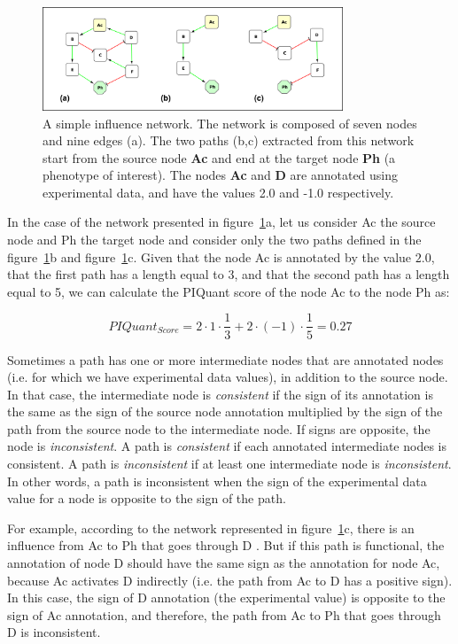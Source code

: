 \begin{figure}
  \centering
  \includegraphics[width=0.8\textwidth]{graphics/piquant_networks}
  \caption{A simple influence network. The network is composed of seven nodes
and nine edges (a). The two paths (b,c) extracted from this network start from
the source node \textbf{Ac} and end at the target node \textbf{Ph} (a phenotype of interest). The
nodes \textbf{Ac} and \textbf{D} are annotated using experimental data, and have the values 2.0
and -1.0 respectively.}
  \label{PIQuant_example}
\end{figure}


In the case of the network presented in figure~\ref{PIQuant_example}a, let us
consider Ac the source node and Ph the target node and consider only the two
paths defined in the figure~\ref{PIQuant_example}b and
figure~\ref{PIQuant_example}c. Given that the
node Ac is annotated by the value $2.0$, that the first path has a length
equal to 3, and that the second path has a length equal to 5, we can calculate the PIQuant score
of the node Ac to the node Ph as:

$$
 PIQuant_{Score} = 2 \cdot 1 \cdot \frac{1}{3} + 2 \cdot (-1) \cdot \frac{1}{5}
= 0.27
$$


Sometimes a path has one or more intermediate nodes that are annotated nodes
(i.e. for which we have experimental data values),
in addition to the source node.
In that case, the intermediate node is \textit{consistent} if the sign of its
annotation is the same as the sign of the source node annotation multiplied by
the sign of the
path from the source node to the intermediate node. If signs are opposite, the
node is \textit{inconsistent}.
A path is \textit{consistent} if each annotated intermediate nodes is
consistent. A path is \textit{inconsistent} if at least one intermediate node is
\textit{inconsistent}.
In other words, a path is inconsistent when the
sign of the experimental data value for a node is opposite to the sign
of the path.

For example, according to the network represented in figure~\ref{PIQuant_example}c, there is an influence from Ac to Ph
that goes through D . But if this path
is functional, the annotation of node D should have the same sign as the annotation for node Ac, because
Ac activates D indirectly (i.e. the path from Ac to D has a positive sign). In this case, the sign of D annotation (the experimental value) is opposite to
the sign of Ac annotation, and therefore, the path from Ac to Ph that goes through D is inconsistent.

